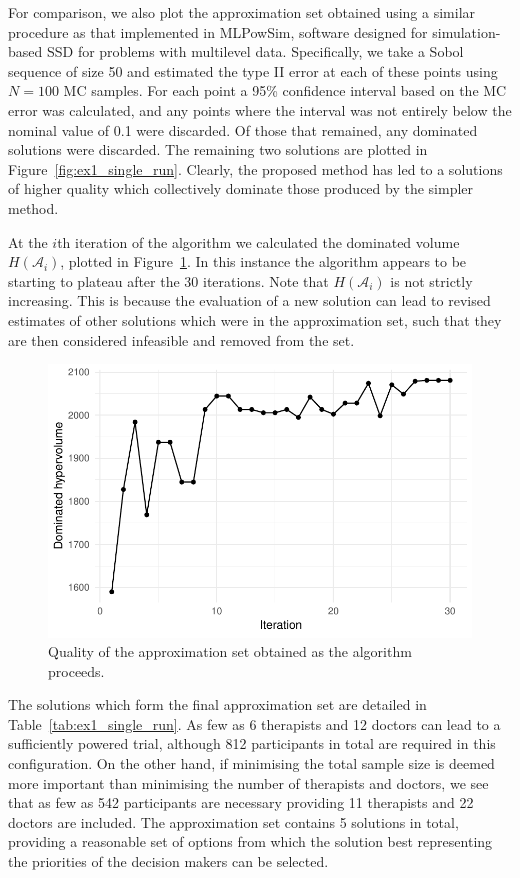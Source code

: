 \documentclass[]{sagej}
\begin{document}
For comparison, we also plot the approximation set obtained using a similar procedure as that implemented in MLPowSim, software designed for simulation-based SSD for problems with multilevel data. Specifically, we take a Sobol sequence of size 50 and estimated the type II error at each of these points using $N = 100$ MC samples. For each point a 95\% confidence interval based on the MC error was calculated, and any points where the interval was not entirely below the nominal value of 0.1 were discarded. Of those that remained, any dominated solutions were discarded. The remaining two solutions are plotted in Figure~\ref{fig:ex1_single_run}. Clearly, the proposed method has led to a solutions of higher quality which  collectively dominate those produced by the simpler method.

At the $i$th iteration of the algorithm we calculated the dominated volume $H(\mathcal{A}_{i})$, plotted in Figure~\ref{fig:ex1_traj}. In this instance the algorithm appears to be starting to plateau after the 30 iterations. Note that $H(\mathcal{A}_{i})$ is not strictly increasing. This is because the evaluation of a new solution can lead to revised estimates of other solutions which were in the approximation set, such that they are then considered infeasible and removed from the set. 

\begin{figure}
\centering
\includegraphics[scale=0.8]{./Figures/ex1_traj}
\caption{Quality of the approximation set obtained as the algorithm proceeds.}
\label{fig:ex1_traj}
\end{figure}

The solutions which form the final approximation set are detailed in Table~\ref{tab:ex1_single_run}. As few as 6 therapists and 12 doctors can lead to a sufficiently powered trial, although 812 participants in total are required in this configuration. On the other hand, if minimising the total sample size is deemed more important than minimising the number of therapists and doctors, we see that as few as 542 participants are necessary providing 11 therapists and 22 doctors are included. The approximation set contains 5 solutions in total, providing a reasonable set of options from which the solution best representing the priorities of the decision makers can be selected.
\end{document}
